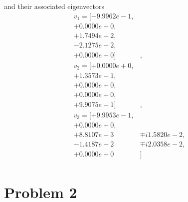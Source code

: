 \documentclass[12pt]{article}
\begin{document}
\noindent and their associated eigenvectors
\begin{equation*}
\begin{split}
v_1 = [  -9.9962e-1, & \\  
         +0.0000e+0, & \\  
         +1.7494e-2, & \\  
         -2.1275e-2, & \\  
         +0.0000e+0]&,  \\ 
v_2 = [  +0.0000e+0, & \\
         +1.3573e-1, & \\
         +0.0000e+0, & \\
         +0.0000e+0, & \\
         +9.9075e-1]&, \\
v_3 = [  +9.9953e-1, & \\ 
         +0.0000e+0, & \\ 
         +8.8107e-3  & \mp i 1.5820e-2, \\ 
         -1.4187e-2  & \mp i 2.0358e-2, \\ 
         +0.0000e+0  &]  \\ 
\end{split}
\end{equation*}

 
\section{Problem 2}
% 
\end{document}
